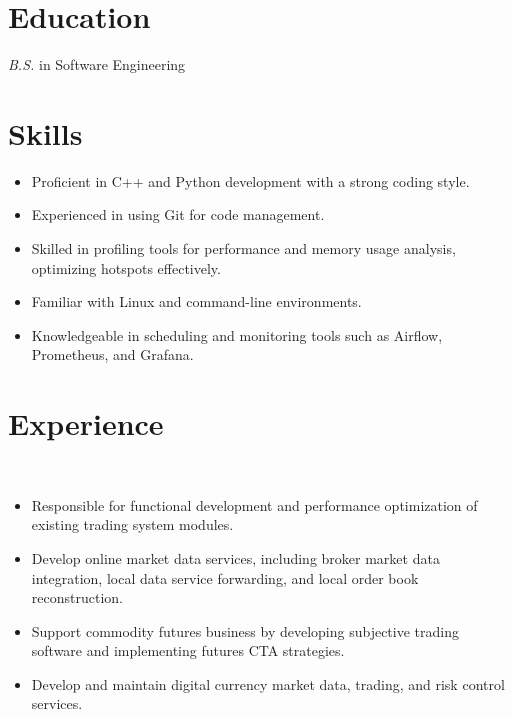\documentclass{resume}
\begin{document}



\section{Education}
\textit{B.S.} in Software Engineering

\section{Skills}
\begin{itemize}
\item Proficient in C++ and Python development with a strong coding style.
\item Experienced in using Git for code management.
\item Skilled in profiling tools for performance and memory usage analysis, optimizing hotspots effectively.
\item Familiar with Linux and command-line environments.
\item Knowledgeable in scheduling and monitoring tools such as Airflow, Prometheus, and Grafana.
\end{itemize}

\section{Experience}

\
\begin{itemize}
\item Responsible for functional development and performance optimization of existing trading system modules.
\item Develop online market data services, including broker market data integration, local data service forwarding, and local order book reconstruction.
\item Support commodity futures business by developing subjective trading software and implementing futures CTA strategies.
\item Develop and maintain digital currency market data, trading, and risk control services.

\end{itemize}
\end{document}
